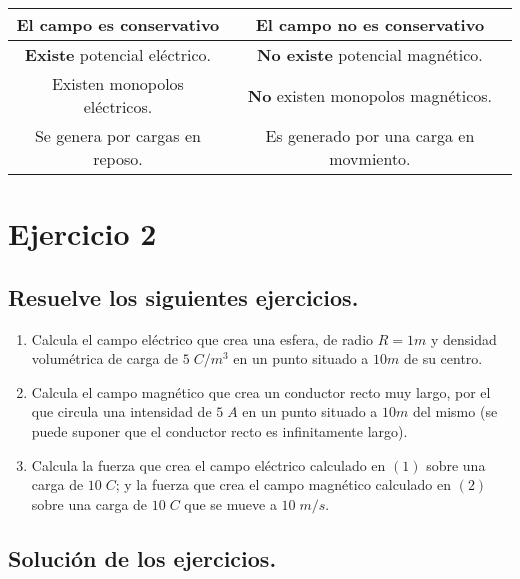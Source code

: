 \documentclass[a4paper,12pt]{article} %
\begin{document}
\begin{longtable}{|c|c|}
    El campo es conservativo & El campo \textbf{no} es conservativo \\ \hline 

    \textbf{Existe} potencial eléctrico. & \textbf{No existe} potencial magnético. \\ \hline

    Existen monopolos eléctricos. & \textbf{No} existen monopolos magnéticos. \\ \hline

    Se genera por cargas en reposo. & Es generado por una carga en movmiento. \\ \hline
\end{longtable}


\section*{Ejercicio 2}

\vspace{\baselineskip}

\subsection*{Resuelve los siguientes ejercicios.}

\vspace{\baselineskip}

\begin{enumerate}
    \item Calcula el campo eléctrico que crea una esfera, de radio \(R = 1m\) y densidad volumétrica de carga de \(5 \; C/m^3\) en un punto situado a \(10m\) de su centro.
    \item Calcula el campo magnético que crea un conductor recto muy largo, por el que circula una intensidad de \(5 \; A\) en un punto situado a \(10 m\) del mismo (se puede suponer que el conductor recto es infinitamente largo).
    \item Calcula la fuerza que crea el campo eléctrico calculado en \((1)\) sobre una carga de \(10 \; C\); y la fuerza que crea el campo magnético calculado en \((2)\) sobre una carga de \(10 \; C\) que se mueve a \(10 \; m/s\).
\end{enumerate}

\subsection*{Solución de los ejercicios.}

\vspace{\baselineskip}
\end{document}
